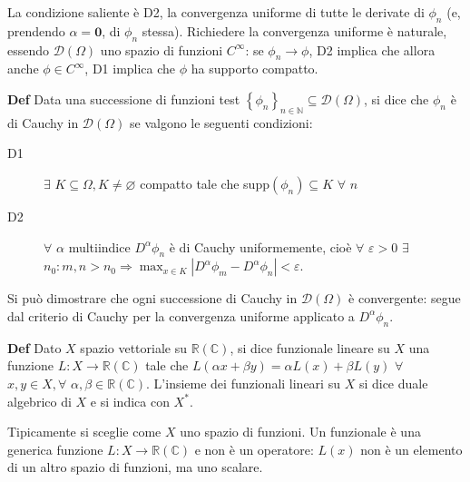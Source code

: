 \documentclass{article}
\begin{document}
La condizione saliente \`{e} D2, la convergenza uniforme di tutte le
derivate di $\phi _{n}$ (e, prendendo $\alpha =\mathbf{0}$, di $\phi _{n}$
stessa). Richiedere la convergenza uniforme \`{e} naturale, essendo $%
\mathcal{D}\left( \Omega \right) $ uno spazio di funzioni $C^{\infty }$: se $%
\phi _{n}\rightarrow \phi $, D2 implica che allora anche $\phi \in C^{\infty
}$, D1 implica che $\phi $ ha supporto compatto.

\textbf{Def} Data una successione di funzioni test $\left\{ \phi
_{n}\right\} _{n\in 
\mathbb{N}
}\subseteq \mathcal{D}\left( \Omega \right) $, si dice che $\phi _{n}$ \`{e}
di Cauchy in $\mathcal{D}\left( \Omega \right) $ se valgono le seguenti
condizioni:

\begin{description}
\item[D1] $\exists $ $K\subseteq \Omega ,K\neq \varnothing $ compatto tale
che supp$\left( \phi _{n}\right) \subseteq K$ $\forall $ $n$

\item[D2] $\forall $ $\alpha $ multiindice $D^{\alpha }\phi _{n}$ \`{e} di
Cauchy uniformemente, cio\`{e} $\forall $ $\varepsilon >0$ $\exists $ $%
n_{0}:m,n>n_{0}\Longrightarrow \max_{x\in K}\left\vert D^{\alpha }\phi
_{m}-D^{\alpha }\phi _{n}\right\vert <\varepsilon $.
\end{description}

Si pu\`{o} dimostrare che ogni successione di Cauchy in $\mathcal{D}\left(
\Omega \right) $ \`{e} convergente: segue dal criterio di Cauchy per la
convergenza uniforme applicato a $D^{\alpha }\phi _{n}$.

\textbf{Def} Dato $X$ spazio vettoriale su $%
\mathbb{R}
\left( 
\mathbb{C}
\right) $, si dice funzionale lineare su $X$ una funzione $L:X\rightarrow 
\mathbb{R}
\left( 
\mathbb{C}
\right) $ tale che $L\left( \alpha x+\beta y\right) =\alpha L\left( x\right)
+\beta L\left( y\right) $ $\forall $ $x,y\in X,\forall $ $\alpha ,\beta \in 
\mathbb{R}
\left( 
\mathbb{C}
\right) $. L'insieme dei funzionali lineari su $X$ si dice duale algebrico
di $X$ e si indica con $X^{\ast }$.

Tipicamente si sceglie come $X$ uno spazio di funzioni. Un funzionale \`{e}
una generica funzione $L:X\rightarrow 
\mathbb{R}
\left( 
\mathbb{C}
\right) $ e non \`{e} un operatore: $L\left( x\right) $ non \`{e} un
elemento di un altro spazio di funzioni, ma uno scalare.
\end{document}
